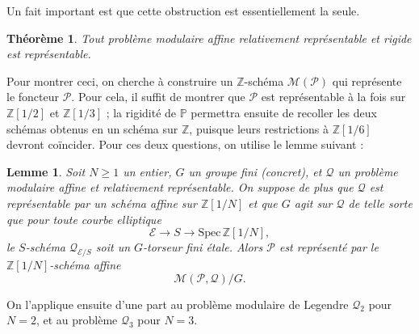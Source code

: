\documentclass[11pt,a4paper]{article}
\newcommand{\Z}{\mathbb{Z}}
\newcommand{\E}{\mathcal{E}}
\renewcommand{\Pr}{\mathcal{P}}
\newcommand{\Qr}{\mathcal{Q}}
\renewcommand{\P}{\mathbb{P}}
\newcommand{\M}{\mathcal{M}}
\newcommand{\vers}{\longrightarrow}
\newcommand{\Spec}{\mathrm{Spec}\,}
\newtheorem*{thm}{Théorème}
\newtheorem*{lem}{Lemme}
\theoremstyle{definition}
\newtheorem*{defi}{Définition}
\begin{document}
Un fait important est que cette obstruction est essentiellement la seule.

\begin{thm}
Tout problème modulaire affine relativement représentable et rigide est représentable.
\end{thm}

Pour montrer ceci, on cherche à construire un $\Z$-schéma $\M(\Pr)$ qui représente le foncteur $\Pr$. Pour cela, il suffit de montrer que $\Pr$ est représentable à la fois sur $\Z[1/2]$ et $\Z[1/3]$ ; la rigidité de $\P$ permettra ensuite de recoller les deux schémas obtenus en un schéma sur $\Z$, puisque leurs restrictions à $\Z[1/6]$ devront coïncider. Pour ces deux questions, on utilise le lemme suivant :

\begin{lem}
Soit $N\geq 1$ un entier, $G$ un groupe fini (concret), et $\Qr$ un problème modulaire affine et relativement représentable. On suppose de plus que $\Qr$ est représentable par un schéma affine sur $\Z[1/N]$ et que $G$ agit sur $\Qr$ de telle sorte que pour toute courbe elliptique
$$\E\vers S\vers \Spec \Z[1/N],$$
le $S$-schéma $\Qr_{\E/S}$ soit un $G$-torseur fini étale. Alors $\Pr$ est représenté par le $\Z[1/N]$-schéma affine
$$\M(\Pr,\Qr)/G.$$
\end{lem}

On l'applique ensuite d'une part au problème modulaire de Legendre $\Qr_2$ pour $N = 2$, et au problème $\Qr_3$ pour $N = 3$.

%
\end{document}
